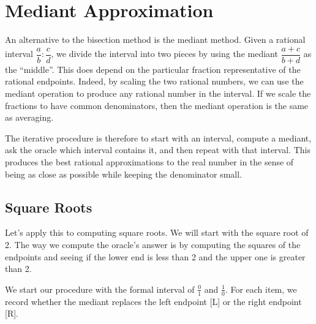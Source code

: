 \documentclass[12pt]{article}
\theoremstyle{remark}
\begin{document}
\section{Mediant Approximation}

An alternative to the bisection method is the mediant method. Given a rational interval $\dfrac{a}{b} : \dfrac{c}{d}$, we divide the interval into two pieces by using the mediant $\dfrac{a+c}{b+d}$ as the ``middle''. This does depend on the particular fraction representative of the rational endpoints. Indeed, by scaling the two rational numbers, we can use the mediant operation to produce any rational number in the interval. If we scale the fractions to have common denominators, then the mediant operation is the same as averaging.  

The iterative procedure is therefore to start with an interval, compute a mediant, ask the oracle which interval contains it, and then repeat with that interval. This produces the best rational approximations to the real number in the sense of being as close as possible while keeping the denominator small. 

\subsection{Square Roots}

Let's apply this to computing square roots. We will start with the square root of 2. The way we compute the oracle's answer is by computing the squares of the endpoints and seeing if the lower end is less than 2 and the upper one is greater than 2.

We start our procedure with the formal interval of $\tfrac{0}{1}$ and $\tfrac{1}{0}$. For each item, we record whether the mediant replaces the left endpoint [L] or the right endpoint [R].
\end{document}
